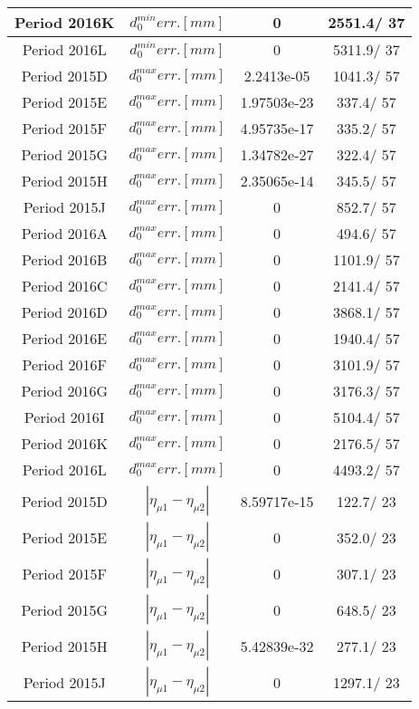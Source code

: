 \documentclass{article}
\begin{document}
\begin{longtable}{c|c|c|c}
\hline
 Period 2016K & $d_{0}^{min} err. [mm]$ & 0 & 2551.4/ 37\\
\hline
 Period 2016L & $d_{0}^{min} err. [mm]$ & 0 & 5311.9/ 37\\
\hline
 Period 2015D & $d_{0}^{max} err. [mm]$ & 2.2413e-05 & 1041.3/ 57\\
\hline
 Period 2015E & $d_{0}^{max} err. [mm]$ & 1.97503e-23 & 337.4/ 57\\
\hline
 Period 2015F & $d_{0}^{max} err. [mm]$ & 4.95735e-17 & 335.2/ 57\\
\hline
 Period 2015G & $d_{0}^{max} err. [mm]$ & 1.34782e-27 & 322.4/ 57\\
\hline
 Period 2015H & $d_{0}^{max} err. [mm]$ & 2.35065e-14 & 345.5/ 57\\
\hline
 Period 2015J & $d_{0}^{max} err. [mm]$ & 0 & 852.7/ 57\\
\hline
 Period 2016A & $d_{0}^{max} err. [mm]$ & 0 & 494.6/ 57\\
\hline
 Period 2016B & $d_{0}^{max} err. [mm]$ & 0 & 1101.9/ 57\\
\hline
 Period 2016C & $d_{0}^{max} err. [mm]$ & 0 & 2141.4/ 57\\
\hline
 Period 2016D & $d_{0}^{max} err. [mm]$ & 0 & 3868.1/ 57\\
\hline
 Period 2016E & $d_{0}^{max} err. [mm]$ & 0 & 1940.4/ 57\\
\hline
 Period 2016F & $d_{0}^{max} err. [mm]$ & 0 & 3101.9/ 57\\
\hline
 Period 2016G & $d_{0}^{max} err. [mm]$ & 0 & 3176.3/ 57\\
\hline
 Period 2016I & $d_{0}^{max} err. [mm]$ & 0 & 5104.4/ 57\\
\hline
 Period 2016K & $d_{0}^{max} err. [mm]$ & 0 & 2176.5/ 57\\
\hline
 Period 2016L & $d_{0}^{max} err. [mm]$ & 0 & 4493.2/ 57\\
\hline
 Period 2015D & $|\eta_{\mu1}-\eta_{\mu2}|$ & 8.59717e-15 & 122.7/ 23\\
\hline
 Period 2015E & $|\eta_{\mu1}-\eta_{\mu2}|$ & 0 & 352.0/ 23\\
\hline
 Period 2015F & $|\eta_{\mu1}-\eta_{\mu2}|$ & 0 & 307.1/ 23\\
\hline
 Period 2015G & $|\eta_{\mu1}-\eta_{\mu2}|$ & 0 & 648.5/ 23\\
\hline
 Period 2015H & $|\eta_{\mu1}-\eta_{\mu2}|$ & 5.42839e-32 & 277.1/ 23\\
\hline
 Period 2015J & $|\eta_{\mu1}-\eta_{\mu2}|$ & 0 & 1297.1/ 23\\

\end{longtable}
\end{document}
